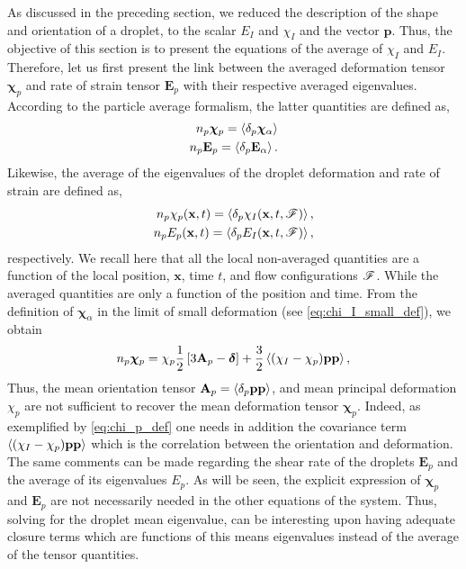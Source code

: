 As discussed in the preceding section, we reduced the description of the shape and orientation of a droplet, to the scalar $E_I$ and $\chi_I$ and the vector $\textbf{p}$. 
Thus, the objective of this section is to present the equations of the average of $\chi_I$ and $E_I$. 
Therefore, let us first present the link between the averaged deformation tensor $\bm\chi_p$ and rate of strain tensor $\textbf{E}_p$ with their respective averaged eigenvalues.
According to the particle average formalism, the latter quantities are defined as,
\begin{align*}
    n_p \bm\chi_p = \left<\delta_p \bm\chi_\alpha\right>\\
    n_p \textbf{E}_p = \left<\delta_p \textbf{E}_\alpha\right>.
\end{align*}
Likewise, the average of the eigenvalues of the droplet deformation and rate of strain are defined as, 
\begin{align*}
    n_p \chi_p(\textbf{x},t) = \left<\delta_p \chi_I(\textbf{x},t,\mathscr{F})\right>,\\
    n_p E_p(\textbf{x},t) = \left<\delta_p E_I(\textbf{x},t,\mathscr{F})\right>,
\end{align*}
respectively. 
We recall here that all the local non-averaged quantities are a function of the local position, $\textbf{x}$, time $t$, and flow configurations $\mathscr{F}$. 
While the averaged quantities are only a function of the position and time. 
From the definition of $\bm\chi_\alpha$ in the limit of small  deformation (see \ref{eq:chi_I_small_def}), we obtain
\begin{equation}
    n_p \bm\chi_p
    = \chi_p
    \frac{1}{2}\left[
        3\textbf{A}_p 
        - \bm\delta
    \right]
    + \frac{3}{2}\avg{(\chi_I - \chi_p) \textbf{pp} }, 
    \label{eq:chi_p_def}
\end{equation}
Thus, the mean orientation tensor $\textbf{A}_p = \left<\delta_p \textbf{pp}\right>$, and mean principal deformation $\chi_p$ are not sufficient to recover the mean deformation tensor $\bm\chi_p$.
Indeed, as exemplified by \ref{eq:chi_p_def} one needs in addition the covariance term $\left<(\chi_I - \chi_p) \textbf{pp} \right>$ which is the correlation between the orientation and deformation. 
The same comments can be made regarding the shear rate of the droplets $\textbf{E}_p$ and the average of its eigenvalues $E_p$. 
As will be seen, the explicit expression of $\bm\chi_p$ and $\textbf{E}_p$ are not necessarily needed in the other equations of the system. 
Thus, solving for the droplet mean eigenvalue, can be interesting upon having adequate closure terms which are functions of this means eigenvalues instead of the average of the tensor quantities.

